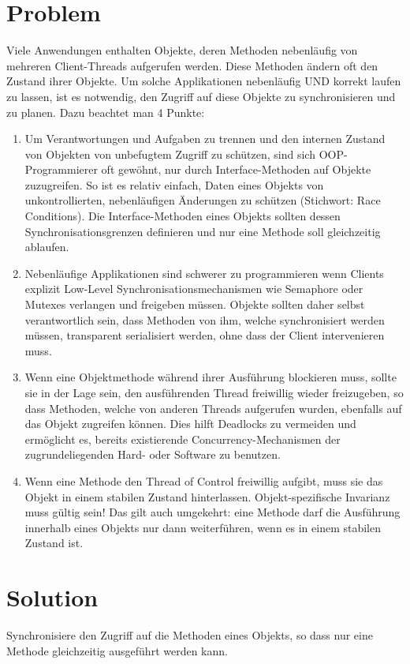 \section{Problem}
Viele Anwendungen enthalten Objekte, deren Methoden nebenläufig von mehreren Client-Threads aufgerufen werden. Diese Methoden ändern oft den Zustand ihrer Objekte. Um solche Applikationen nebenläufig UND korrekt laufen zu lassen, ist es notwendig, den Zugriff auf diese Objekte zu synchronisieren und zu planen.
Dazu beachtet man 4 Punkte:
\begin{enumerate}
  \item Um Verantwortungen und Aufgaben zu trennen und den internen Zustand von Objekten von unbefugtem Zugriff zu schützen, sind sich OOP-Programmierer oft gewöhnt, nur durch Interface-Methoden auf Objekte zuzugreifen. So ist es relativ einfach, Daten eines Objekts von unkontrollierten, nebenläufigen Änderungen zu schützen (Stichwort: Race Conditions). Die Interface-Methoden eines Objekts sollten dessen Synchronisationsgrenzen definieren und nur eine Methode soll gleichzeitig ablaufen.
  \item Nebenläufige Applikationen sind schwerer zu programmieren wenn Clients explizit Low-Level Synchronisationsmechanismen wie Semaphore oder Mutexes verlangen und freigeben müssen. Objekte sollten daher selbst verantwortlich sein, dass Methoden von ihm, welche synchronisiert werden müssen, transparent serialisiert werden, ohne dass der Client intervenieren muss.
  \item Wenn eine Objektmethode während ihrer Ausführung blockieren muss, sollte sie in der Lage sein, den ausführenden Thread freiwillig wieder freizugeben, so dass Methoden, welche von anderen Threads aufgerufen wurden, ebenfalls auf das Objekt zugreifen können. Dies hilft Deadlocks zu vermeiden und ermöglicht es, bereits existierende Concurrency-Mechanismen der zugrundeliegenden Hard- oder Software zu benutzen.
  \item Wenn eine Methode den Thread of Control freiwillig aufgibt, muss sie das Objekt in einem stabilen Zustand hinterlassen. Objekt-spezifische Invarianz muss gültig sein! Das gilt auch umgekehrt: eine Methode darf die Ausführung innerhalb eines Objekts nur dann weiterführen, wenn es in einem stabilen Zustand ist.
\end{enumerate}

\section{Solution}
Synchronisiere den Zugriff auf die Methoden eines Objekts, so dass nur eine Methode gleichzeitig ausgeführt werden kann.

